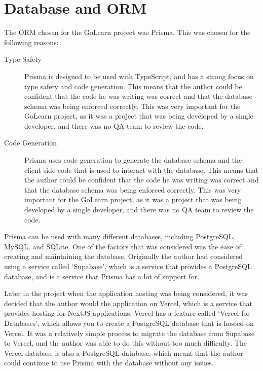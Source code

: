 \documentclass[12pt, a4paper,twoside]{report}
\theoremstyle{plain} %
\theoremstyle{definition} %
\numberwithin{equation}{chapter}
\begin{document}
\section{Database and ORM}\label{sec:databaseorm}

The ORM chosen for the GoLearn project was Prisma. This was chosen for the
following reasons:

\begin{description}
    \item[Type Safety\cite{prisma-type-safety}] {
        Prisma is designed to be used with TypeScript, and has a strong focus
        on type safety and code generation. This means that the author could
        be confident that the code he was writing was correct and that the
        database schema was being enforced correctly. This was very important
        for the GoLearn project, as it was a project that was being developed
        by a single developer, and there was no QA team to review the code.
        }
    \item[Code Generation\cite{prisma-code-generation}] {
        Prisma uses code generation to generate the database schema and the
        client-side code that is used to interact with the database. This
        means that the author could be confident that the code he was writing
        was correct and that the database schema was being enforced correctly.
        This was very important for the GoLearn project, as it was a project
        that was being developed by a single developer, and there was no QA
        team to review the code.
        }
\end{description}

Prisma can be used with many different databases, including PostgreSQL, MySQL,
and SQLite. One of the factors that was considered was the ease of creating and
maintaining the database. Originally the author had considered using a service
called `Supabase', which is a service that provides a PostgreSQL database, and
is a service that Prisma has a lot of support for.

Later in the project when the application hosting was being considered, it was
decided that the author would the application on Vercel, which is a service that
provides hosting for NextJS applications. Vercel has a feature called `Vercel for
Databases', which allows you to create a PostgreSQL database that is hosted on
Vercel. It was a relatively simple process to migrate the database from Supabase
to Vercel, and the author was able to do this without too much difficulty. The
Vercel database is also a PostgreSQL database, which meant that the author could
continue to use Prisma with the database without any issues.
\end{document}
